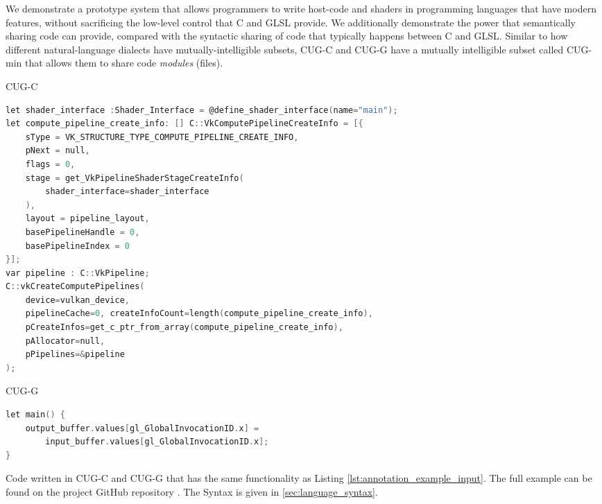 \documentclass[a4paper,12pt,twoside,openright]{report}
\begin{document}
We demonstrate a prototype system that allows programmers to write host-code
and shaders in programming languages that have modern features, without
sacrificing the low-level control that C and GLSL provide. We additionally
demonstrate the power that semantically sharing code can provide, compared with
the syntactic sharing of code that typically happens between C and GLSL.
Similar to how different natural-language dialects have mutually-intelligible
subsets, CUG-C and CUG-G have a mutually intelligible subset called CUG-min
that allows them to share code \textit{modules} (files).



\begin{lstfloat}
\begin{center} CUG-C \end{center}
\begin{lstlisting}[language=C]
let shader_interface :Shader_Interface = @define_shader_interface(name="main");
let compute_pipeline_create_info: [] C::VkComputePipelineCreateInfo = [{
    sType = VK_STRUCTURE_TYPE_COMPUTE_PIPELINE_CREATE_INFO,
    pNext = null,
    flags = 0,
    stage = get_VkPipelineShaderStageCreateInfo(
        shader_interface=shader_interface
    ),
    layout = pipeline_layout,
    basePipelineHandle = 0,
    basePipelineIndex = 0
}];
var pipeline : C::VkPipeline;
C::vkCreateComputePipelines(
    device=vulkan_device,
    pipelineCache=0, createInfoCount=length(compute_pipeline_create_info),
    pCreateInfos=get_c_ptr_from_array(compute_pipeline_create_info),
    pAllocator=null,
    pPipelines=&pipeline
);
\end{lstlisting}
\begin{center} CUG-G \end{center}
\begin{lstlisting}[language=C]
let main() {
    output_buffer.values[gl_GlobalInvocationID.x] =
        input_buffer.values[gl_GlobalInvocationID.x];
}
\end{lstlisting}
\caption{Code written in CUG-C and CUG-G that has the same functionality as
Listing \ref{lst:annotation_example_input}. The full example can be found on
the project GitHub repository \cite{ProjectSource}. The Syntax is given in
\ref{sec:language_syntax}.}
\label{lst:language_example}
\end{lstfloat}
\end{document}
